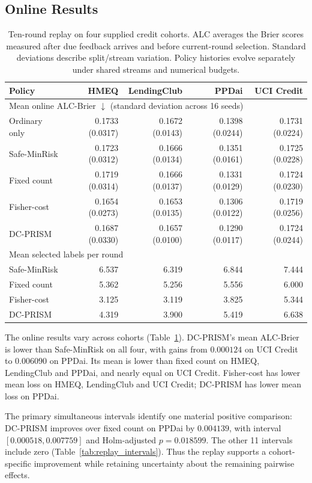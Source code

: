 \documentclass[runningheads]{llncs}
\begin{document}
\subsection{Online Results}
\begin{table}[t]
\caption{Ten-round replay on four supplied credit cohorts. ALC averages the Brier scores measured after due feedback arrives and before current-round selection. Standard deviations describe split/stream variation. Policy histories evolve separately under shared streams and numerical budgets.}
\label{tab:replay}
\centering
\small
\begin{tabular}{lrrrr}
\toprule
Policy & HMEQ & LendingClub & PPDai & UCI Credit \\
\midrule
\multicolumn{5}{l}{Mean online ALC-Brier $\downarrow$ (standard deviation across 16 seeds)} \\
Ordinary only & 0.1733 (0.0317) & 0.1672 (0.0143) & 0.1398 (0.0244) & 0.1731 (0.0224) \\
Safe-MinRisk & 0.1723 (0.0312) & 0.1666 (0.0134) & 0.1351 (0.0161) & 0.1725 (0.0228) \\
Fixed count & 0.1719 (0.0314) & 0.1666 (0.0137) & 0.1331 (0.0129) & 0.1724 (0.0230) \\
Fisher-cost & 0.1654 (0.0273) & 0.1653 (0.0135) & 0.1306 (0.0122) & 0.1719 (0.0256) \\
DC-PRISM & 0.1687 (0.0330) & 0.1657 (0.0100) & 0.1290 (0.0117) & 0.1724 (0.0244) \\
\midrule
\multicolumn{5}{l}{Mean selected labels per round} \\
Safe-MinRisk & 6.537 & 6.319 & 6.844 & 7.444 \\
Fixed count & 5.362 & 5.256 & 5.556 & 6.000 \\
Fisher-cost & 3.125 & 3.119 & 3.825 & 5.344 \\
DC-PRISM & 4.319 & 3.900 & 5.419 & 6.638 \\
\bottomrule
\end{tabular}
\end{table}


The online results vary across cohorts (Table~\ref{tab:replay}). DC-PRISM's mean ALC-Brier is lower than Safe-MinRisk on all four, with gains from $0.000124$ on UCI Credit to $0.006090$ on PPDai. Its mean is lower than fixed count on HMEQ, LendingClub and PPDai, and nearly equal on UCI Credit. Fisher-cost has lower mean loss on HMEQ, LendingClub and UCI Credit; DC-PRISM has lower mean loss on PPDai.

The primary simultaneous intervals identify one material positive comparison: DC-PRISM improves over fixed count on PPDai by $0.004139$, with interval $[0.000518,0.007759]$ and Holm-adjusted $p=0.018599$. The other 11 intervals include zero (Table~\ref{tab:replay_intervals}). Thus the replay supports a cohort-specific improvement while retaining uncertainty about the remaining pairwise effects.
\end{document}

